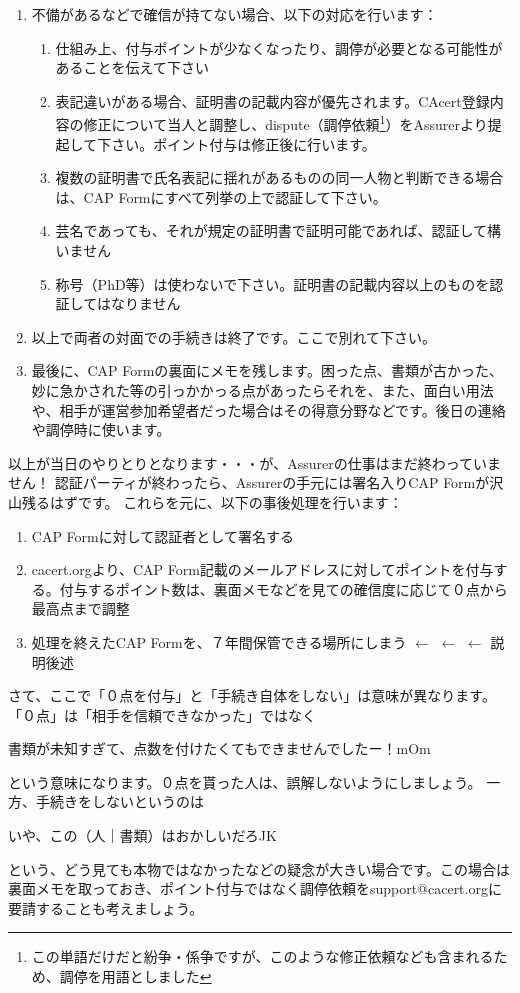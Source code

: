 \documentclass[mingoth,a4paper]{jsarticle}
\begin{document}
\begin{enumerate}
\item 不備があるなどで確信が持てない場合、以下の対応を行います：
\begin{enumerate}
\item 仕組み上、付与ポイントが少なくなったり、調停が必要となる可能性があることを伝えて下さい
\item 表記違いがある場合、証明書の記載内容が優先されます。CAcert登録内容の修正について当人と調整し、dispute（調停依頼\footnote{この単語だけだと紛争・係争ですが、このような修正依頼なども含まれるため、調停を用語としました}）をAssurerより提起して下さい。ポイント付与は修正後に行います。
\item 複数の証明書で氏名表記に揺れがあるものの同一人物と判断できる場合は、CAP Formにすべて列挙の上で認証して下さい。
\item 芸名であっても、それが規定の証明書で証明可能であれば、認証して構いません
\item 称号（PhD等）は使わないで下さい。証明書の記載内容以上のものを認証してはなりません
\end{enumerate}
\item 以上で両者の対面での手続きは終了です。ここで別れて下さい。
\item 最後に、CAP Formの裏面にメモを残します。困った点、書類が古かった、妙に急かされた等の引っかかっる点があったらそれを、また、面白い用法や、相手が運営参加希望者だった場合はその得意分野などです。後日の連絡や調停時に使います。
\end{enumerate}

以上が当日のやりとりとなります・・・が、Assurerの仕事はまだ終わっていません！
認証パーティが終わったら、Assurerの手元には署名入りCAP Formが沢山残るはずです。
これらを元に、以下の事後処理を行います：
\begin{enumerate}
\item CAP Formに対して認証者として署名する
\item cacert.orgより、CAP Form記載のメールアドレスに対してポイントを付与する。付与するポイント数は、裏面メモなどを見ての確信度に応じて０点から最高点まで調整
\item 処理を終えたCAP Formを、７年間保管できる場所にしまう $\leftarrow$ $\leftarrow$ $\leftarrow$ 説明後述
\end{enumerate}

さて、ここで「０点を付与」と「手続き自体をしない」は意味が異なります。
「０点」は「相手を信頼できなかった」ではなく
\begin{center}
\Large{書類が未知すぎて、点数を付けたくてもできませんでしたー！mOm}
\end{center}
という意味になります。０点を貰った人は、誤解しないようにしましょう。
一方、手続きをしないというのは
\begin{center}
\Large{いや、この（人｜書類）はおかしいだろJK}
\end{center}
という、どう見ても本物ではなかったなどの疑念が大きい場合です。この場合は
裏面メモを取っておき、ポイント付与ではなく調停依頼をsupport@cacert.orgに
要請することも考えましょう。
\end{document}
